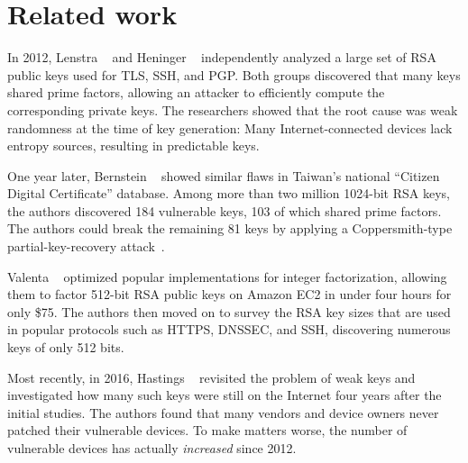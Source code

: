\section{Related work}
\label{sec:related}
In 2012, Lenstra \ea~\cite{Lenstra2012a} and Heninger \ea~\cite{Heninger2012a}
independently analyzed a large set of RSA public keys used for TLS, SSH, and
PGP.  Both groups discovered that many keys shared prime factors, allowing an
attacker to efficiently compute the corresponding private keys.  The researchers
showed that the root cause was weak randomness at the time of key generation: 
Many Internet-connected devices lack entropy sources, resulting in predictable
keys.

One year later, Bernstein \ea~\cite{Bernstein2013a} showed similar flaws in
Taiwan's national ``Citizen Digital Certificate'' database.  Among more than two
million 1024-bit RSA keys, the authors discovered 184 vulnerable keys, 103 of
which shared prime factors.  The authors could break the remaining 81 keys by
applying a Coppersmith-type partial-key-recovery
attack~\cite{Coppersmith1996a,Coppersmith1997a}.

Valenta \ea~\cite{Valenta2016a} optimized popular implementations for integer
factorization, allowing them to factor 512-bit RSA public keys on Amazon EC2 in
under four hours for only \$75.  The authors then moved on to survey the RSA key
sizes that are used in popular protocols such as HTTPS, DNSSEC, and SSH,
discovering numerous keys of only 512 bits.

Most recently, in 2016, Hastings \ea~\cite{Hastings2016a} revisited the problem
of weak keys and investigated how many such keys were still on the Internet four 
years after the initial studies.  The authors found that many vendors and device
owners never patched their vulnerable devices.  To make matters worse, 
the number of vulnerable devices has actually \emph{increased} since 2012.
